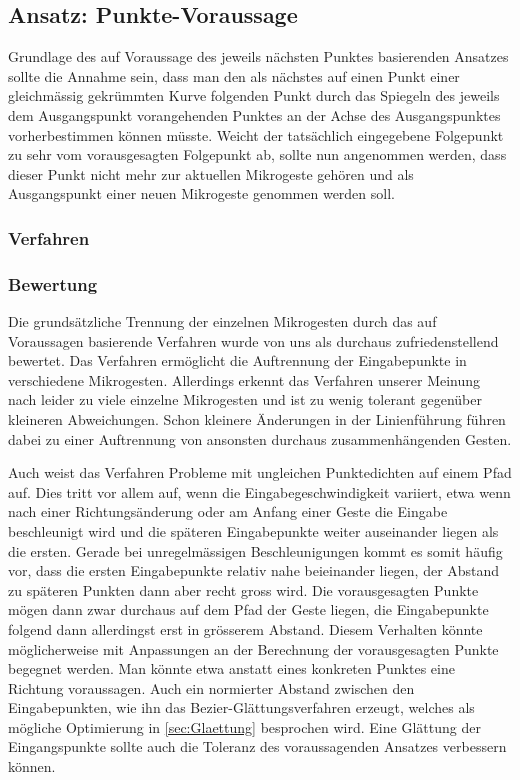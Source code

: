 \subsection{Ansatz: Punkte-Voraussage}
Grundlage des auf Voraussage des jeweils nächsten Punktes basierenden Ansatzes sollte die Annahme sein, dass man den als nächstes auf einen Punkt einer gleichmässig gekrümmten Kurve folgenden Punkt durch das Spiegeln des jeweils dem Ausgangspunkt vorangehenden Punktes an der Achse des Ausgangspunktes vorherbestimmen können müsste. Weicht der tatsächlich eingegebene Folgepunkt zu sehr vom vorausgesagten Folgepunkt ab, sollte nun angenommen werden, dass dieser Punkt nicht mehr zur aktuellen Mikrogeste gehören und als Ausgangspunkt einer neuen Mikrogeste genommen werden soll.

\subsubsection{Verfahren}


\subsubsection{Bewertung}
Die grundsätzliche Trennung der einzelnen Mikrogesten durch das auf Voraussagen basierende Verfahren wurde von uns als durchaus zufriedenstellend bewertet. Das Verfahren ermöglicht die Auftrennung der Eingabepunkte in verschiedene Mikrogesten. Allerdings erkennt das Verfahren unserer Meinung nach leider zu viele einzelne Mikrogesten und ist zu wenig tolerant gegenüber kleineren Abweichungen. Schon kleinere Änderungen in der Linienführung führen dabei zu einer Auftrennung von ansonsten durchaus zusammenhängenden Gesten.

Auch weist das Verfahren Probleme mit ungleichen Punktedichten auf einem Pfad auf. Dies tritt vor allem auf, wenn die Eingabegeschwindigkeit variiert, etwa wenn nach einer Richtungsänderung oder am Anfang einer Geste die Eingabe beschleunigt wird und die späteren Eingabepunkte weiter auseinander liegen als die ersten. Gerade bei unregelmässigen Beschleunigungen kommt es somit häufig vor, dass die ersten Eingabepunkte relativ nahe beieinander liegen, der Abstand zu späteren Punkten dann aber recht gross wird. Die vorausgesagten Punkte mögen dann zwar durchaus auf dem Pfad der Geste liegen, die Eingabepunkte folgend dann allerdingst erst in grösserem Abstand. Diesem Verhalten könnte möglicherweise mit Anpassungen an der Berechnung der vorausgesagten Punkte begegnet werden. Man könnte etwa anstatt eines konkreten Punktes eine Richtung voraussagen. Auch ein normierter Abstand zwischen den Eingabepunkten, wie ihn das Bezier-Glättungsverfahren erzeugt, welches als mögliche Optimierung in \ref{sec:Glaettung} besprochen wird. Eine Glättung der Eingangspunkte sollte auch die Toleranz des voraussagenden Ansatzes verbessern können.

